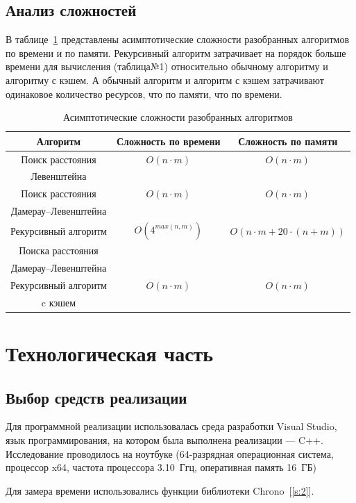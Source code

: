 \documentclass[14pt]{article}
\begin{document}
\subsection{Анализ сложностей} 
В таблице~\ref{tab:chara} представлены асимптотические сложности разобранных алгоритмов по времени и по памяти. Рекурсивный алгоритм затрачивает на порядок больше времени для вычисления (таблица№1) относительно обычному алгоритму и алгоритму с кэшем. А обычный алгоритм и алгоритм с кэшем затрачивают одинаковое количество ресурсов, что по памяти, что по времени.
\begin{table}[htbp]
	\centering
	\caption{Асимптотические сложности разобранных алгоритмов}
	\begin{tabular}{|c|c|c|}
		\hline
		Алгоритм & Сложность по времени & Сложность по памяти \\
		\hline
		Поиск расстояния& $O(n\cdot m)$ &  $O(n\cdot m)$\\
		Левенштейна&&\\
		\hline
		Поиск расстояния & $O(n\cdot m)$ &  $O(n\cdot m)$\\
		Дамерау--Левенштейна &&\\
		\hline
		Рекурсивный алгоритм& $O(4^{max(n, m)})$ & $O(n\cdot m + 20\cdot(n+m))$\\
		Поиска расстояния &&\\
		Дамерау--Левенштейна&&\\ 
		\hline
		Рекурсивный алгоритм& $O(n\cdot m)$ & $O(n\cdot m)$\\
		c кэшем&&\\
		\hline
	\end{tabular}
	\label{tab:chara}
\end{table}

\newpage

\section{Технологическая часть} 
\subsection{Выбор средств реализации}
Для программной реализации использовалась среда разработки Visual Studio, язык программирования, на котором была выполнена реализации --- C++. 
Исследование проводилось на ноутбуке (64-разрядная операционная система, процессор x64, частота процессора 3.10~Ггц, оперативная память 16~ГБ)\par
Для замера времени использовались функции библиотеки Chrono~[\ref{s:2}].
\end{document}
